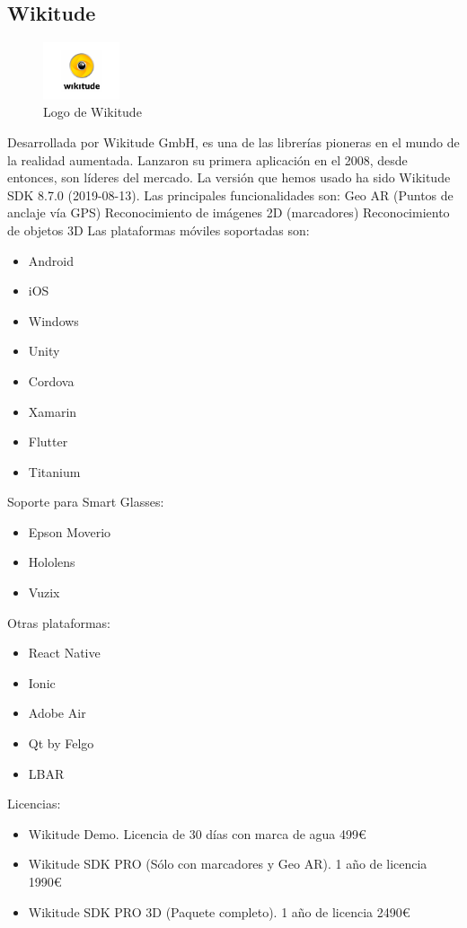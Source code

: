 \subsection{Wikitude}
\begin{figure}[H]
    \centering
    \includegraphics[width=0.2\textwidth]{Images/Wikitude_Logo.png}
    \caption{Logo de Wikitude}
    \label{fig:Wikitude}
\end{figure}
Desarrollada por Wikitude GmbH, es una de las librerías pioneras en el mundo de la realidad aumentada. Lanzaron su primera aplicación en el 2008, desde entonces, son líderes del mercado. La versión que hemos usado ha sido Wikitude SDK 8.7.0 (2019-08-13).\cite{Wikitude}
Las principales funcionalidades son:
Geo AR (Puntos de anclaje vía GPS)
Reconocimiento de imágenes 2D (marcadores) 
Reconocimiento de objetos 3D
Las plataformas móviles soportadas son:
\begin{itemize}
\item Android
\item iOS
\item Windows
\item Unity
\item Cordova
\item Xamarin
\item Flutter
\item Titanium
\end{itemize}
Soporte para Smart Glasses:
\begin{itemize}
\item Epson Moverio
\item Hololens
\item Vuzix
\end{itemize}
Otras plataformas:
\begin{itemize}
\item React Native
\item Ionic
\item Adobe Air
\item Qt by Felgo
\item LBAR
\end{itemize}
Licencias:
\begin{itemize}
\item Wikitude Demo. Licencia de 30 días con marca de agua 499€
\item Wikitude SDK PRO (Sólo con marcadores y Geo AR). 1 año de licencia 1990€
\item Wikitude SDK PRO 3D (Paquete completo). 1 año de licencia 2490€
\end{itemize}


